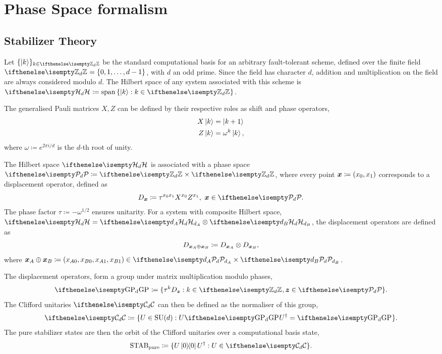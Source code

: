 \documentclass[pra,
aps,
twocolumn,
superscriptaddress,
groupedaddress,
nofootinbib,
reprint
]{revtex4-1}
\begin{document}
\section{Phase Space formalism}
\label{sec:ps}

\subsection{Stabilizer Theory}\label{sec:so}

Let $\{\ket{k}\}_{k \in \zd}$ be the standard computational basis for an arbitrary fault-tolerant scheme, defined over the finite field $\zd = \{ 0, 1, \dots,d-1 \}$, with $d$ an odd prime. 
Since the field has character $d$, addition and multiplication on the field are always considered modulo $d$.
The Hilbert space of any system associated with this scheme is $\hd \coloneqq \spanv{\ket{k}: k \in \zd}$.

The generalised Pauli matrices $X, Z$ can be defined by their respective roles as shift and phase operators,
\begin{align}
    X \ket{k} &= \ket{k + 1} \label{eq:xpauli}\\
	Z \ket{k} &= \omega^k \ket{k}, \label{eq:zpauli}
\end{align}
where $\omega \coloneqq e^{2\pi i/d}$ is the $d$-th root of unity. 

The Hilbert space $\hd$ is associated with a phase space $\pd \coloneqq \zd \times \zd$, where every point $\bm{x} \coloneqq (x_0, x_1)$ corresponds to a displacement operator, defined as
\begin{equation}\label{eq:ddef}
    D_{\bmx} \coloneqq \tau^{x_0 x_1} X^{x_0} Z^{x_1},\ \bmx  \in \pd.
\end{equation}
The phase factor $\tau \coloneqq -\omega^{1/2}$ ensures unitarity.
For a system with composite Hilbert space, $\hd = \hd[d_A] \otimes \hd[d_B]$, the displacement operators are defined as
\begin{equation}\label{eq:composited}
    D_{\bm{x}_A \oplus \bm{x}_B} \coloneqq D_{\bm{x}_A} \otimes D_{\bm{x}_B},
\end{equation}
where $\bmx_A \oplus \bmx_B \coloneqq (x_{A0}, x_{B0}, x_{A1}, x_{B1}) \in \pd[d_A] \times \pd[d_B]$.

The displacement operators, form a group under matrix multiplication modulo phases,
\begin{equation}\label{eq:gp}
    \gp \coloneqq \{ \tau^k D_{\bmz}: k \in \zd, \bmz \in \pd\}.
\end{equation}
The Clifford unitaries $\cd$ can then be defined as the normaliser of this group, 
\begin{equation}
    \cd \coloneqq \{ U \in {\rm{SU}}(d): U\gp U^\dagger = \gp \}.
\end{equation}
The pure stabilizer states are then the orbit of the Clifford unitaries over a computational basis state,
\begin{equation}\label{eq:stab}
    \stab_{{\rm{pure}}} \coloneqq \{ U\ketbra{0}{0}U^\dagger: U \in \cd \}.
\end{equation}
\end{document}
